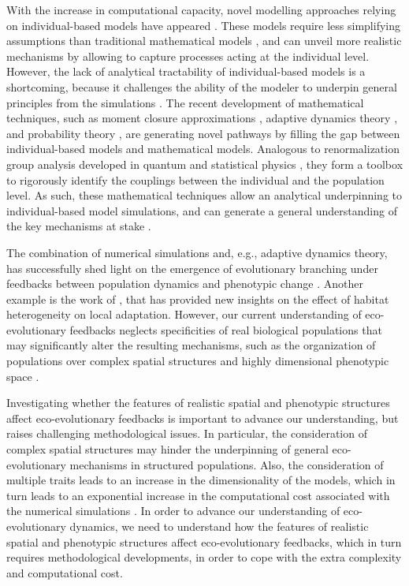 With the increase in computational capacity, novel modelling approaches relying on individual-based models have appeared \citep{deangelis2005individual}. These models require less simplifying assumptions than traditional mathematical models \citep{deangelis2005individual}, and can unveil more realistic mechanisms by allowing to capture processes acting at the individual level. However, the lack of analytical tractability of individual-based models is a shortcoming, because it challenges the ability of the modeler to underpin general principles from the simulations \citep{Lion2016,May2004}.
% 
The recent development of mathematical techniques, such as moment closure approximations \citep{law1999moment,Gandhi2000,Nordbotten2020,Lion2016}, adaptive dynamics theory \citep{Metz1995}, and probability theory \citep{Champagnat2006}, are generating novel pathways by filling the gap between individual-based models and mathematical models. 
% 
Analogous to renormalization group analysis developed in quantum and statistical physics \citep{Sayama}, they form a toolbox to rigorously identify the couplings between the individual and the population level. As such, these mathematical techniques allow an analytical underpinning to individual-based model simulations, and can generate a general understanding of the key mechanisms at stake \citep{Lion2016}.

The combination of numerical simulations and, e.g., adaptive dynamics theory, has successfully shed light on the emergence of evolutionary branching under feedbacks between population dynamics and phenotypic change \citep{Dieckmann1999,Doebeli2003}.
%
Another example is the work of \cite{Meszena1997,Debarre2013, Mirrahimi2020}, that has provided new insights on the effect of habitat heterogeneity on local adaptation. 
% 
However, our current understanding of eco-evolutionary feedbacks neglects specificities of real biological populations that may significantly alter the resulting mechanisms, such as the organization of populations over complex spatial structures \citep{Nowak2001a} and highly dimensional phenotypic space \citep{Doebeli2010}.

% 
Investigating whether the features of realistic spatial and phenotypic structures affect eco-evolutionary feedbacks is important to advance our understanding, but raises challenging methodological issues. 
% 
In particular, the consideration of complex spatial structures may hinder the underpinning of general eco-evolutionary mechanisms in structured populations.
% 
Also, the consideration of multiple traits leads to an increase in the dimensionality of the models, which in turn leads to an exponential increase in the computational cost associated with the numerical simulations \citep{Bellman1957}.
% 
In order to advance our understanding of eco-evolutionary dynamics, we need to understand how the features of realistic spatial and phenotypic structures affect eco-evolutionary feedbacks, which in turn requires methodological developments, in order to cope with the extra complexity and computational cost.

